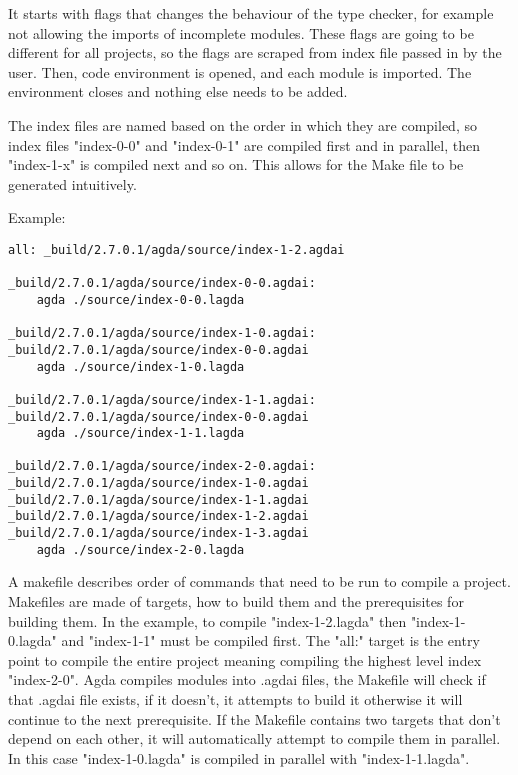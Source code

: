 It starts with flags that changes the behaviour of the type checker, for
example not allowing the imports of incomplete modules. These flags are going
to be different for all projects, so the flags are scraped from index file
passed in by the user. Then, code environment is opened, and each module is
imported. The environment closes and nothing else needs to be added.

The index files are named based on the order in which they are compiled, so
index files "index-0-0" and "index-0-1" are compiled first and in parallel,
then "index-1-x" is compiled next and so on. This allows for the Make file to
be generated intuitively. 

Example:

\begin{lstlisting}
all: _build/2.7.0.1/agda/source/index-1-2.agdai 

_build/2.7.0.1/agda/source/index-0-0.agdai: 
	agda ./source/index-0-0.lagda

_build/2.7.0.1/agda/source/index-1-0.agdai: _build/2.7.0.1/agda/source/index-0-0.agdai 
	agda ./source/index-1-0.lagda

_build/2.7.0.1/agda/source/index-1-1.agdai: _build/2.7.0.1/agda/source/index-0-0.agdai 
	agda ./source/index-1-1.lagda

_build/2.7.0.1/agda/source/index-2-0.agdai: _build/2.7.0.1/agda/source/index-1-0.agdai _build/2.7.0.1/agda/source/index-1-1.agdai _build/2.7.0.1/agda/source/index-1-2.agdai _build/2.7.0.1/agda/source/index-1-3.agdai 
	agda ./source/index-2-0.lagda
\end{lstlisting}


A makefile describes order of commands that need to be run to compile a
project. Makefiles are made of targets, how to build them and the prerequisites
for building them. In the example, to compile "index-1-2.lagda" then
"index-1-0.lagda" and "index-1-1" must be compiled first. The "all:" target is
the entry point to compile the entire project meaning compiling the highest
level index "index-2-0". Agda compiles modules into .agdai files, the Makefile
will check if that .agdai file exists, if it doesn't, it attempts to build it
otherwise it will continue to the next prerequisite. If the Makefile contains
two targets that don't depend on each other, it will automatically attempt to
compile them in parallel. In this case "index-1-0.lagda" is compiled in
parallel with "index-1-1.lagda".


